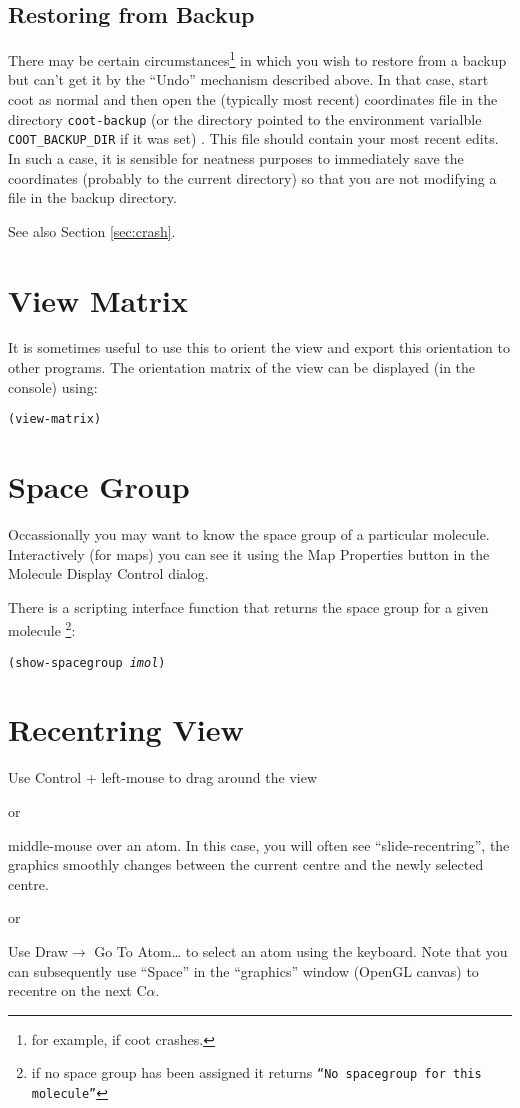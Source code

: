 \documentclass{book}
\begin{document}
\subsection{Restoring from Backup}
 There may be certain
circumstances\footnote{for example, if coot crashes.} in which you
wish to restore from a backup but can't get it by the ``Undo''
mechanism described above.  In that case, start coot as normal and
then open the (typically most recent) coordinates file in the
directory \texttt{coot-backup} (or the directory pointed to the
environment varialble \texttt{COOT\_BACKUP\_DIR} if it was set) .
This file should contain your most recent edits.  In such a case, it
is sensible for neatness purposes to immediately save the coordinates
(probably to the current directory) so that you are not modifying a
file in the backup directory.

See also Section \ref{sec:crash}.

\section{View Matrix}
It is sometimes useful to use this to orient the
view and export this orientation to other programs.  The orientation
matrix of the view can be displayed (in the console) using:

\texttt{(view-matrix)}

\section{Space Group}
Occassionally you may want to know the space group of a particular
molecule.  Interactively (for maps) you can see it using the Map
Properties button in the Molecule Display Control dialog.

There is a scripting interface function that returns the space group
for a given molecule \footnote{if no space group has been assigned it
  returns \texttt{``No spacegroup for this molecule''}}:

\texttt{(show-spacegroup \emph{imol})}

\section{Recentring View}
\label{sec:recentring-view}
\begin{trivlist}
\item Use Control + left-mouse to drag around the view
\item or
\item middle-mouse over an atom.  In this case, you will often see
  ``slide-recentring'', the graphics smoothly changes between the
  current centre and the newly selected centre.
\item or
\item Use \textsf{Draw$ \rightarrow$ Go To Atom\ldots} to select an atom
  using the keyboard.  Note that you can subsequently use ``Space'' in
  the ``graphics'' window (OpenGL canvas) to recentre on the next
  C$\alpha$.
\end{trivlist}
\end{document}
